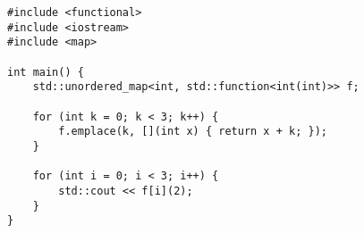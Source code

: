 \begin{lstlisting}[title=\href{https://godbolt.org/z/QssJXN}{\texttt{godbolt.org/z/QssJXN}}]
#include <functional>
#include <iostream>
#include <map>

int main() {
    std::unordered_map<int, std::function<int(int)>> f;
    
    for (int k = 0; k < 3; k++) {
        f.emplace(k, [](int x) { return x + k; });
    }

    for (int i = 0; i < 3; i++) {
        std::cout << f[i](2);
    }
}
\end{lstlisting}

